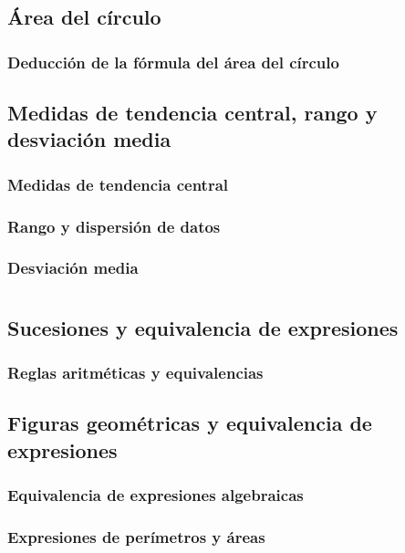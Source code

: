 \documentclass[11pt]{book}
\begin{document}
\section{\'Area del c\'irculo}
\subsection{Deducción de la f\'ormula del \'area del c\'irculo}


\section{Medidas de tendencia central, rango y desviación media}
\subsection{Medidas de tendencia central}
\subsection{Rango y dispersi\'on de datos}
\subsection{Desviaci\'on media}


\chapter{}

\section{Sucesiones y equivalencia de expresiones}
\subsection{Reglas aritméticas y equivalencias}

\section{Figuras geométricas y equivalencia de expresiones}
\subsection{Equivalencia de expresiones algebraicas}
\subsection{Expresiones de perímetros y áreas}
\end{document}
